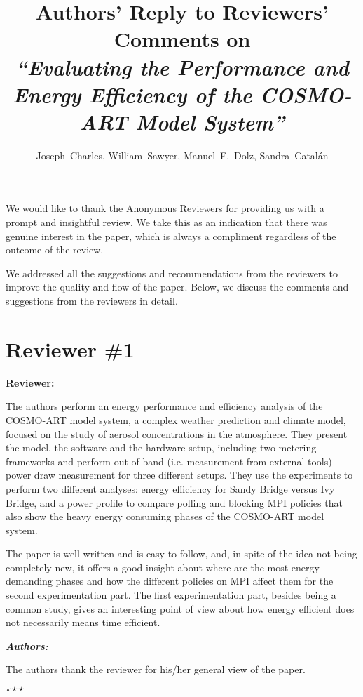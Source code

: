 \documentclass[a4paper,11pt]{article}
\title{Authors' Reply to Reviewers' Comments on\\ \itshape{``Evaluating the Performance and Energy Efficiency of the COSMO-ART Model System''}}
\author{Joseph~Charles, William~Sawyer, Manuel~F.~Dolz, Sandra~Catal\'an}
\newcounter{question}
\newcommand{\reviewerSay}{\vspace{0.2cm} {\bf \noindent } {\bf Reviewer:} \medskip \par}
\newcommand{\weReply}{\vspace{0.25cm} {\bf \noindent } \addtocounter{question}{1} \textbf{\emph{Authors:}} \medskip \em\par}
\newenvironment{weSay}{\bigskip \weReply \begin{it}}{\end{it}\begin{center} \samepage$\star \star \star$ \end{center}}
\begin{document}
\maketitle

\noindent 
We would like to thank the Anonymous Reviewers
for providing us with a prompt and insightful review. 
We take this as an indication that there was genuine interest in the paper,
which is always a compliment regardless of the outcome of the review.

We addressed all the suggestions and recommendations from the reviewers to improve
the quality and flow of the paper. Below, we discuss the comments and suggestions
from the reviewers in detail.



\newpage
\section*{Reviewer \#1}

\reviewerSay
The authors perform an energy performance and efficiency analysis of the COSMO-ART model system,
a complex weather prediction and climate model, focused on the study of aerosol concentrations in the
atmosphere. They present the model, the software and the hardware setup, including two metering
frameworks and perform out-of-band (i.e. measurement from external tools) power draw measurement
for three different setups. They use the experiments to perform two different analyses: energy 
efficiency for Sandy Bridge versus Ivy Bridge, and a power profile to compare polling and blocking 
MPI policies that also show the heavy energy consuming phases of the COSMO-ART model system.

The paper is well written and is easy to follow, and, in spite of the idea not being completely new, 
it offers a good insight about where are the most energy demanding phases and how the different 
policies on MPI affect them for the second experimentation part. The first experimentation part, 
besides being a common study, gives an interesting point of view about how energy efficient does 
not necessarily means time efficient.

\begin{weSay}
The authors thank the reviewer for his/her general view of the paper.
\end{weSay}
\end{document}
